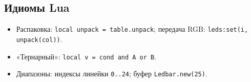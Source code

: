 \subsection{Идиомы Lua}
\begin{itemize}
  \item Распаковка: \texttt{local unpack = table.unpack}; передача RGB: \texttt{leds:set(i, unpack(col))}.
  \item «Тернарный»: \texttt{local v = cond and A or B}.
  \item Диапазоны: индексы линейки \texttt{0..24}; буфер \texttt{Ledbar.new(25)}.
\end{itemize}
